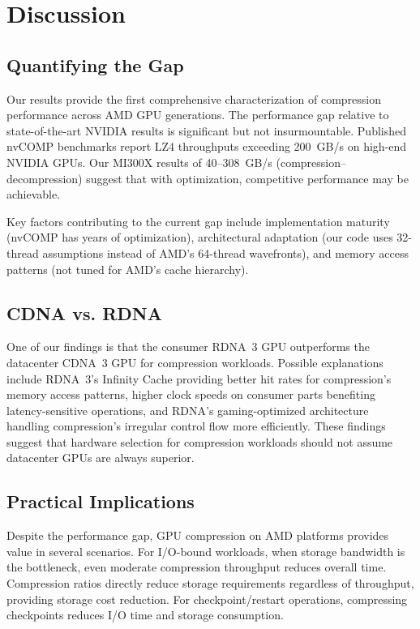 \documentclass[runningheads]{llncs}
\begin{document}
\section{Discussion}
\label{sec:discussion}

\subsection{Quantifying the Gap}

Our results provide the first comprehensive characterization of compression performance across AMD GPU generations. The performance gap relative to state-of-the-art NVIDIA results is significant but not insurmountable. Published nvCOMP benchmarks report LZ4 throughputs exceeding 200~GB/s on high-end NVIDIA GPUs. Our MI300X results of 40--308~GB/s (compression--decompression) suggest that with optimization, competitive performance may be achievable.

Key factors contributing to the current gap include implementation maturity (nvCOMP has years of optimization), architectural adaptation (our code uses 32-thread assumptions instead of AMD's 64-thread wavefronts), and memory access patterns (not tuned for AMD's cache hierarchy).

\subsection{CDNA vs. RDNA}

One of our findings is that the consumer RDNA~3 GPU outperforms the datacenter CDNA~3 GPU for compression workloads. Possible explanations include RDNA~3's Infinity Cache providing better hit rates for compression's memory access patterns, higher clock speeds on consumer parts benefiting latency-sensitive operations, and RDNA's gaming-optimized architecture handling compression's irregular control flow more efficiently. These findings suggest that hardware selection for compression workloads should not assume datacenter GPUs are always superior.

\subsection{Practical Implications}

Despite the performance gap, GPU compression on AMD platforms provides value in several scenarios. For I/O-bound workloads, when storage bandwidth is the bottleneck, even moderate compression throughput reduces overall time. Compression ratios directly reduce storage requirements regardless of throughput, providing storage cost reduction. For checkpoint/restart operations, compressing checkpoints reduces I/O time and storage consumption.
\end{document}
